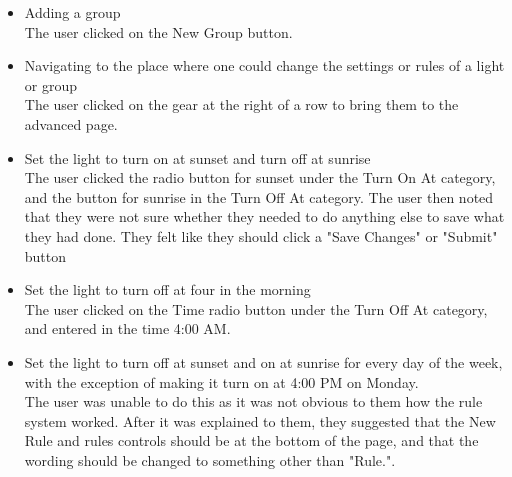 \documentclass[oneside,openright]{book}
\begin{document}
\begin{itemize}
  \item Adding a group \\
    The user clicked on the New Group button.
  \item Navigating to the place where one could change the settings or rules of a light or group \\
    The user clicked on the gear at the right of a row to bring them to the advanced page.
  \item Set the light to turn on at sunset and turn off at sunrise \\
    The user clicked the radio button for sunset under the Turn On At category, and the button for sunrise in the Turn Off At category. The user then noted that they were not sure whether they needed to do anything else to save what they had done. They felt like they should click a "Save Changes" or "Submit" button
  \item Set the light to turn off at four in the morning \\
    The user clicked on the Time radio button under the Turn Off At category, and entered in the time 4:00 AM.
  \item Set the light to turn off at sunset and on at sunrise for every day of the week, with the exception of making it turn on at 4:00 PM on Monday. \\
    The user was unable to do this as it was not obvious to them how the rule system worked. After it was explained to them, they suggested that the New Rule and rules controls should be at the bottom of the page, and that the wording should be changed to something other than "Rule.".
\end{itemize}
\end{document}
